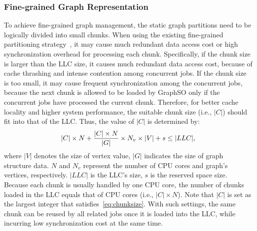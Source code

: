 \documentclass[10pt,journal,compsoc]{IEEEtran}
\begin{document}
\subsubsection{Fine-grained Graph Representation}\label{section:3.2}
\vspace{-2pt}
To achieve fine-grained graph management, the static graph partitions need to be logically divided into small chunks.
When using the existing fine-grained partitioning strategy~\cite{GraphChi,GridGraph,Graphene}, it may cause much redundant data access cost or high synchronization overhead for processing each chunk.
Specifically, if the chunk size is larger than the LLC size, it causes much redundant data access cost, because of cache thrashing and intense contention among concurrent jobs. If the chunk size is too small, it may cause frequent synchronization among the concurrent jobs, because the next chunk is allowed to be loaded by GraphSO only if the concurrent jobs have processed the current chunk.
Therefore, for better cache locality and higher system performance,
the suitable chunk size (i.e., $\left|C\right|$) should fit into that of the LLC. Thus, the value of $|C|$ is determined by:
\vspace{-4pt}
\begin{equation}
\label{eq:chunksize}
\vspace{-1pt}
|C| \times N + \frac{|C|\times N}{|G|} \times N_v \times \left| V \right| + s \le |LLC|,
\vspace{-2pt}
\end{equation}
where $|V|$ denotes the size of vertex value, $|G|$ indicates the size of graph structure data. $N$ and $N_v$ represent the number of CPU cores and graph's vertices, respectively. $|LLC|$ is the LLC's size,  $s$ is the reserved space size. Because each chunk is usually handled by one CPU core, the number of chunks loaded in the LLC equals that of CPU cores (i.e., $|C| \times N$). Note that $|C|$ is set as the largest integer that satisfies~\eqref{eq:chunksize}. With such settings, the same chunk can be reused by all related jobs once it is loaded into the LLC, while incurring low synchronization cost at the same time.
\end{document}
